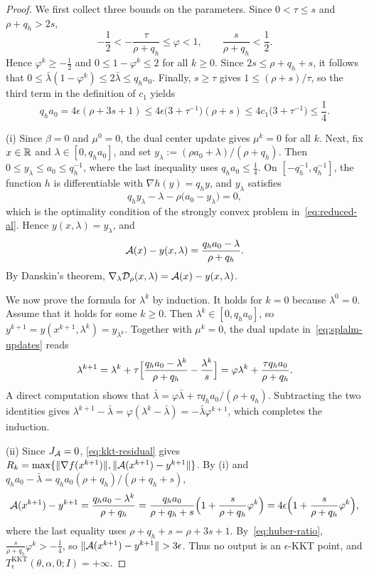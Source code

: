 \begin{proof}
We first collect three bounds on the parameters. Since \(0<\tau\le s\) and
\(\rho+q_h>2s\),
\begin{equation}
\label{eq:huber-ratio}
-\frac12<-\frac{\tau}{\rho+q_h}\le\varphi<1,
\qquad
\frac{s}{\rho+q_h}<\frac12 .
\end{equation}
Hence \(\varphi^k\ge-\frac12\) and \(0\le1-\varphi^k\le2\) for all
\(k\ge0\). Since \(2s\le\rho+q_h+s\), it follows that
\(0\le\bar\lambda(1-\varphi^k)\le2\bar\lambda\le q_ha_0\). Finally,
\(s\ge\tau\) gives \(1\le(\rho+s)/\tau\), so the third term in the
definition of \(c_1\) yields
\[
q_ha_0=4\epsilon(\rho+3s+1)
\le4\epsilon\bigl(3+\tau^{-1}\bigr)(\rho+s)
\le4c_1\bigl(3+\tau^{-1}\bigr)
\le\frac14 .
\]

(i) Since \(\beta=0\) and \(\mu^0=0\), the dual center update gives
\(\mu^k=0\) for all \(k\). Next, fix \(x\in\mathbb{R}\) and
\(\lambda\in[0,q_ha_0]\), and set
\(y_\lambda:=(\rho a_0+\lambda)/(\rho+q_h)\). Then
\(0\le y_\lambda\le a_0\le q_h^{-1}\), where the last inequality uses
\(q_ha_0\le\frac14\). On \([-q_h^{-1},q_h^{-1}]\), the function \(h\) is
differentiable with \(\nabla h(y)=q_hy\), and \(y_\lambda\) satisfies
\[
q_hy_\lambda-\lambda-\rho\bigl(a_0-y_\lambda\bigr)=0,
\]
which is the optimality condition of the strongly convex problem
in~\eqref{eq:reduced-al}. Hence \(y(x,\lambda)=y_\lambda\), and
\[
\mathcal{A}(x)-y(x,\lambda)=\frac{q_ha_0-\lambda}{\rho+q_h}.
\]
By Danskin's theorem,
\(\nabla_\lambda\mathcal{D}_\rho(x,\lambda)=\mathcal{A}(x)-y(x,\lambda)\).

We now prove the formula for \(\lambda^k\) by induction. It holds for
\(k=0\) because \(\lambda^0=0\). Assume that it holds for some \(k\ge0\).
Then \(\lambda^k\in[0,q_ha_0]\), so
\(y^{k+1}=y(x^{k+1},\lambda^k)=y_{\lambda^k}\). Together with
\(\mu^k=0\), the dual update in~\eqref{eq:splalm-updates} reads
\[
\lambda^{k+1}
=\lambda^k+\tau\Bigl[\frac{q_ha_0-\lambda^k}{\rho+q_h}
-\frac{\lambda^k}{s}\Bigr]
=\varphi\lambda^k+\frac{\tau q_ha_0}{\rho+q_h}.
\]
A direct computation shows that
\(\bar\lambda=\varphi\bar\lambda+\tau q_ha_0/(\rho+q_h)\). Subtracting the
two identities gives
\(\lambda^{k+1}-\bar\lambda=\varphi(\lambda^k-\bar\lambda)
=-\bar\lambda\varphi^{k+1}\), which completes the induction.

(ii) Since \(J_{\mathcal{A}}=0\), \eqref{eq:kkt-residual} gives
\(R_k=\max\{\|\nabla f(x^{k+1})\|,\|\mathcal{A}(x^{k+1})-y^{k+1}\|\}\). By (i)
and \(q_ha_0-\bar\lambda=q_ha_0(\rho+q_h)/(\rho+q_h+s)\),
\[
\mathcal{A}(x^{k+1})-y^{k+1}
=\frac{q_ha_0-\lambda^k}{\rho+q_h}
=\frac{q_ha_0}{\rho+q_h+s}\Bigl(1+\frac{s}{\rho+q_h}\varphi^k\Bigr)
=4\epsilon\Bigl(1+\frac{s}{\rho+q_h}\varphi^k\Bigr),
\]
where the last equality uses \(\rho+q_h+s=\rho+3s+1\).
By~\eqref{eq:huber-ratio}, \(\frac{s}{\rho+q_h}\varphi^k>-\frac14\), so
\(\|\calA(x^{k+1})-y^{k+1}\|>3\epsilon\). Thus no output is an
\(\epsilon\)-KKT point, and
\(T^{\mathrm{KKT}}_\epsilon(\theta,\alpha,0;I)=+\infty\).
\end{proof}

